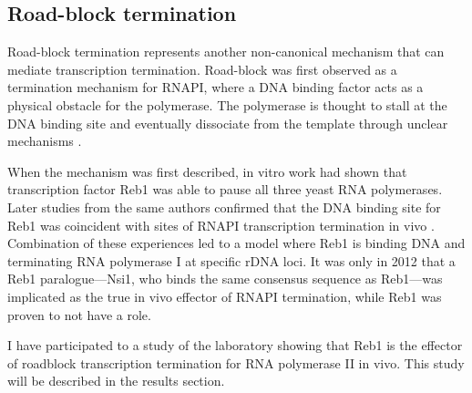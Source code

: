 \subsection{Road-block termination}
  
Road-block termination represents another non-canonical mechanism that can mediate transcription termination. 
Road-block was first observed as a termination mechanism for RNAPI, where  a DNA binding factor acts as a physical obstacle for the polymerase. 
The polymerase is thought to stall at the DNA binding site and eventually dissociate from the template through unclear mechanisms \cite{lang:1994:model, lang:1993:reb1}. 

When the mechanism was first described, in vitro work had shown that transcription factor Reb1 was able to pause all three yeast RNA polymerases\cite{lang:1994:model}. 
Later studies from the same authors confirmed that the DNA binding site for Reb1 was coincident with sites of RNAPI transcription termination in vivo \cite{reeder:1999:saccharomyces}. 
Combination of these experiences led to a model where Reb1 is binding DNA and terminating RNA polymerase I at specific rDNA loci. 
It was only in 2012 that a Reb1 paralogue---Nsi1, who binds the same consensus sequence as Reb1---was implicated as the true in vivo effector of RNAPI termination, while Reb1 was proven to not have a role\cite{reiter:2012:reb1homologue}. 

I have participated to a study of the laboratory showing that Reb1 is the effector of roadblock transcription termination for RNA polymerase II in vivo. 
This study will be described in the results section.

\clearpage